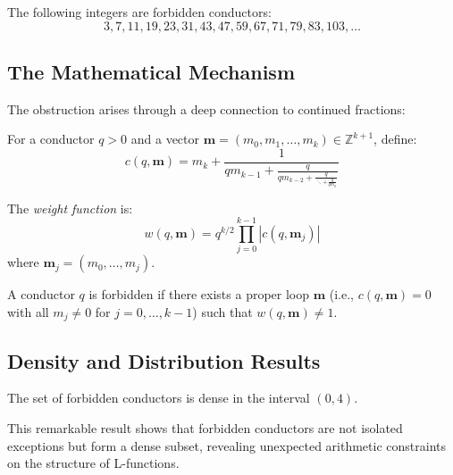 \begin{example}
The following integers are forbidden conductors:
\begin{equation}
3, 7, 11, 19, 23, 31, 43, 47, 59, 67, 71, 79, 83, 103, \ldots
\end{equation}
\end{example}

\subsection{The Mathematical Mechanism}

The obstruction arises through a deep connection to continued fractions:

\begin{definition}
For a conductor $q > 0$ and a vector $\mathbf{m} = (m_0, m_1, \ldots, m_k) \in \mathbb{Z}^{k+1}$, define:
\begin{equation}
c(q, \mathbf{m}) = m_k + \frac{1}{qm_{k-1} + \frac{q}{qm_{k-2} + \frac{q}{\ddots + \frac{q}{qm_0}}}}
\end{equation}

The \emph{weight function} is:
\begin{equation}
w(q, \mathbf{m}) = q^{k/2} \prod_{j=0}^{k-1} |c(q, \mathbf{m}_j)|
\end{equation}
where $\mathbf{m}_j = (m_0, \ldots, m_j)$.
\end{definition}

\begin{theorem}
A conductor $q$ is forbidden if there exists a proper loop $\mathbf{m}$ (i.e., $c(q, \mathbf{m}) = 0$ with all $m_j \neq 0$ for $j = 0, \ldots, k-1$) such that $w(q, \mathbf{m}) \neq 1$.
\end{theorem}

\subsection{Density and Distribution Results}

\begin{theorem}
The set of forbidden conductors is dense in the interval $(0, 4)$.
\end{theorem}

This remarkable result shows that forbidden conductors are not isolated exceptions but form a dense subset, revealing unexpected arithmetic constraints on the structure of L-functions.

